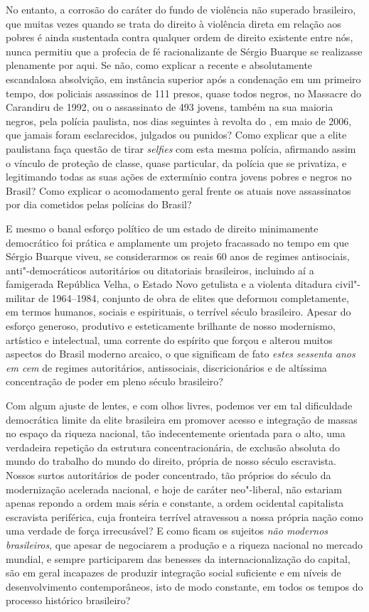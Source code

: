 No entanto, a corrosão do caráter do fundo de violência não superado
brasileiro, que muitas vezes quando se trata do direito à violência
direta em relação aos pobres é ainda sustentada contra qualquer ordem de
direito existente entre nós, nunca permitiu que a profecia de fé
racionalizante de Sérgio Buarque se realizasse plenamente por aqui. Se
não, como explicar a recente e absolutamente escandalosa absolvição, em
instância superior após a condenação em um primeiro tempo, dos policiais
assassinos de 111 presos, quase todos negros, no Massacre do Carandiru
de 1992, ou o assassinato de 493 jovens, também na sua maioria negros,
pela polícia paulista, nos dias seguintes à revolta do , em maio de
2006, que jamais foram esclarecidos, julgados ou punidos? Como explicar
que a elite paulistana faça questão de tirar \emph{selfies} com esta
mesma polícia, afirmando assim o vínculo de proteção de classe, quase
particular, da polícia que se privatiza, e legitimando todas as suas
ações de extermínio contra jovens pobres e negros no Brasil? Como
explicar o acomodamento geral frente os atuais nove assassinatos por dia
cometidos pelas polícias do Brasil?

E mesmo o banal esforço político de um estado de direito minimamente
democrático foi prática e amplamente um projeto fracassado no tempo em
que Sérgio Buarque viveu, se considerarmos os reais 60 anos de regimes
antisociais, anti"-democráticos autoritários ou ditatoriais brasileiros,
incluindo aí a famigerada República Velha, o Estado Novo getulista e a
violenta ditadura civil"-militar de 1964--1984, conjunto de obra de elites
que deformou completamente, em termos humanos, sociais e espirituais, o
terrível século  brasileiro. Apesar do esforço generoso, produtivo e
esteticamente brilhante de nosso modernismo, artístico e intelectual,
uma corrente do espírito que forçou e alterou muitos aspectos do Brasil
moderno arcaico, o que significam de fato \emph{estes sessenta anos em
cem} de regimes autoritários, antissociais, discricionários e de
altíssima concentração de poder em pleno século  brasileiro?

Com algum ajuste de lentes, e com olhos livres, podemos ver em tal
dificuldade democrática limite da elite brasileira em promover acesso e
integração de massas no espaço da riqueza nacional, tão indecentemente
orientada para o alto, uma verdadeira repetição da estrutura
concentracionária, de exclusão absoluta do mundo do trabalho do mundo do
direito, própria de nosso século  escravista. Nossos surtos
autoritários de poder concentrado, tão próprios do século da
modernização acelerada nacional, e hoje de caráter neo"-liberal, não
estariam apenas repondo a ordem mais séria e constante, a ordem
ocidental capitalista escravista periférica, cuja fronteira terrível
atravessou a nossa própria nação como uma verdade de força irrecusável?
E como ficam os sujeitos \emph{não modernos brasileiros}, que apesar de
negociarem a produção e a riqueza nacional no mercado mundial, e sempre
participarem das benesses da internacionalização do capital, são em
geral incapazes de produzir integração social suficiente e em níveis de
desenvolvimento contemporâneos, isto de modo constante, em todos os
tempos do processo histórico brasileiro?

